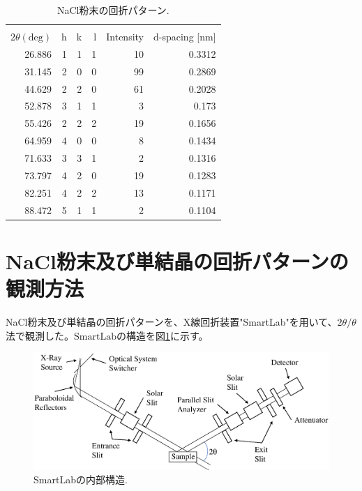\documentclass[11pt,a4j,uplatex]{jsarticle}
\begin{document}
\begin{table}[htbp]
 \begin{center}
  \caption{NaCl粉末の回折パターン\cite{powder}.}
  \begin{tabular}{|r|r|r|r|r|r|}  \hline
                           & \multicolumn{3}{c|}{} &   &                                \\
   $2\theta(\mathrm{deg})$ & h                     & k & l & Intensity & d-spacing [nm] \\  \hline \hline
   26.886                  & 1                     & 1 & 1 & 10        & 0.3312         \\
   31.145                  & 2                     & 0 & 0 & 99        & 0.2869         \\
   44.629                  & 2                     & 2 & 0 & 61        & 0.2028         \\
   52.878                  & 3                     & 1 & 1 & 3         & 0.173          \\
   55.426                  & 2                     & 2 & 2 & 19        & 0.1656         \\
   64.959                  & 4                     & 0 & 0 & 8         & 0.1434         \\
   71.633                  & 3                     & 3 & 1 & 2         & 0.1316         \\
   73.797                  & 4                     & 2 & 0 & 19        & 0.1283         \\
   82.251                  & 4                     & 2 & 2 & 13        & 0.1171         \\
   88.472                  & 5                     & 1 & 1 & 2         & 0.1104         \\ \hline
  \end{tabular}
  \label{data}
 \end{center}
\end{table}

\newpage
\section{NaCl粉末及び単結晶の回折パターンの観測方法}

NaCl粉末及び単結晶の回折パターンを、X線回折装置"SmartLab"を用いて、$2\theta/\theta$法で観測した。$\mathrm{SmartLab}$の構造を図\ref{smartlab}に示す。


\begin{figure}[htb]
 \centering
 \includegraphics[clip,width=12cm]{XRD.eps}
 \caption{SmartLabの内部構造.}
 \label{smartlab}
\end{figure}
\end{document}
